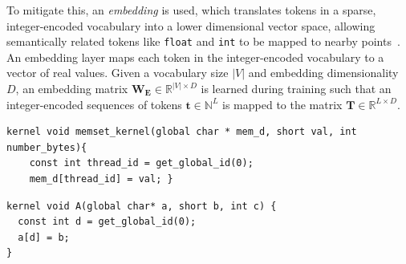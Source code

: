 To mitigate this, an \emph{embedding} is used, which translates tokens in a sparse, integer-encoded vocabulary into a lower dimensional vector space, allowing semantically related tokens like \texttt{float} and \texttt{int} to be mapped to nearby points~\cite{Mikolov2013a,Baroni2014}. An embedding layer maps each token in the integer-encoded vocabulary to a vector of real values. Given a vocabulary size $|V|$ and embedding dimensionality $D$, an embedding matrix $\bm{W_{E}} \in \mathbb{R}^{|V| \times D}$ is learned during training such that an integer-encoded sequences of tokens $\bm{t} \in \mathbb{N}^{L}$ is mapped to the matrix $\bm{T} \in \mathbb{R}^{L \times D}$. 

\newsavebox{\NvidiaStreamClusterInput}
\begin{lrbox}{\NvidiaStreamClusterInput}
  \begin{minipage}{\textwidth}
    \begin{verbatim}
kernel void memset_kernel(global char * mem_d, short val, int number_bytes){
    const int thread_id = get_global_id(0);
    mem_d[thread_id] = val; }
    \end{verbatim}
  \end{minipage}
\end{lrbox}

\newsavebox{\NvidiaStreamClusterOutput}
\begin{lrbox}{\NvidiaStreamClusterOutput}
  \begin{minipage}{\textwidth}
    \begin{verbatim}
kernel void A(global char* a, short b, int c) {
  const int d = get_global_id(0);
  a[d] = b;
}
    \end{verbatim}
  \end{minipage}
\end{lrbox}


